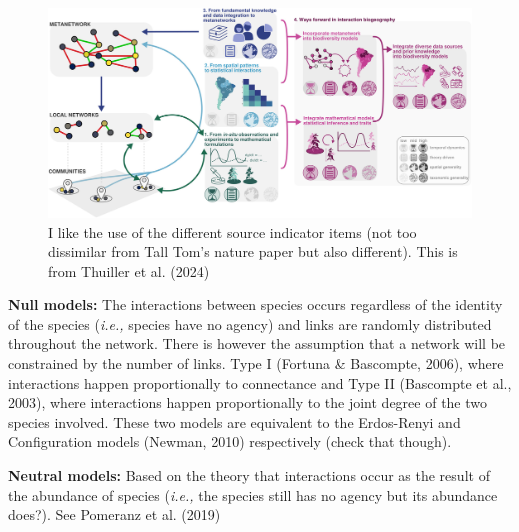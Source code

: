 \documentclass[
]{article}
\begin{document}
\begin{figure}[H]

{\centering \includegraphics{images/thullier_2023_concept.jpeg}

}

\caption{I like the use of the different source indicator items (not too
dissimilar from Tall Tom's nature paper but also different). This is
from Thuiller et al. (2024)}

\end{figure}%

\textbf{Null models:} The interactions between species occurs regardless
of the identity of the species (\emph{i.e.,} species have no agency) and
links are randomly distributed throughout the network. There is however
the assumption that a network will be constrained by the number of
links. Type I (Fortuna \& Bascompte, 2006), where interactions happen
proportionally to connectance and Type II (Bascompte et al., 2003),
where interactions happen proportionally to the joint degree of the two
species involved. These two models are equivalent to the Erdos-Renyi and
Configuration models (Newman, 2010) respectively (check that though).

\textbf{Neutral models:} Based on the theory that interactions occur as
the result of the abundance of species (\emph{i.e.,} the species still
has no agency but its abundance does?). See Pomeranz et al. (2019)
\end{document}
